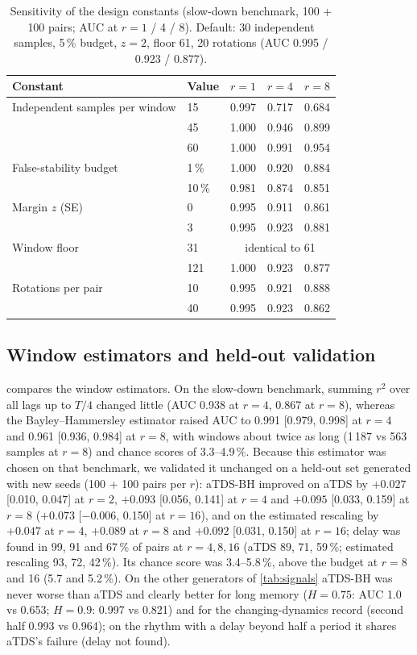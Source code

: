 \documentclass[11pt,a4paper]{article}
\begin{document}
\begin{table}[t]
\centering
\caption{Sensitivity of the design constants (slow-down benchmark, 100 + 100 pairs; AUC at $r = 1$ / 4 / 8). Default: 30 independent samples, 5\,\% budget, $z = 2$, floor 61, 20 rotations (AUC 0.995 / 0.923 / 0.877).}
\label{tab:sensitivity}
\footnotesize
\begin{tabular}{llccc}
\toprule
Constant & Value & $r = 1$ & $r = 4$ & $r = 8$ \\
\midrule
Independent samples per window & 15 & 0.997 & 0.717 & 0.684 \\
 & 45 & 1.000 & 0.946 & 0.899 \\
 & 60 & 1.000 & 0.991 & 0.954 \\
False-stability budget & 1\,\% & 1.000 & 0.920 & 0.884 \\
 & 10\,\% & 0.981 & 0.874 & 0.851 \\
Margin $z$ (SE) & 0 & 0.995 & 0.911 & 0.861 \\
 & 3 & 0.995 & 0.923 & 0.881 \\
Window floor & 31 & \multicolumn{3}{c}{identical to 61} \\
 & 121 & 1.000 & 0.923 & 0.877 \\
Rotations per pair & 10 & 0.995 & 0.921 & 0.888 \\
 & 40 & 0.995 & 0.923 & 0.862 \\
\bottomrule
\end{tabular}
\end{table}

\subsection{Window estimators and held-out validation}
\label{sec:res-bh}
 compares the window estimators. On the slow-down benchmark, summing $r^2$ over all lags up to $T/4$ changed little (AUC 0.938 at $r = 4$, 0.867 at $r = 8$), whereas the Bayley--Hammersley estimator raised AUC to 0.991 [0.979, 0.998] at $r = 4$ and 0.961 [0.936, 0.984] at $r = 8$, with windows about twice as long (1\,187 vs 563 samples at $r = 8$) and chance scores of 3.3--4.9\,\%. Because this estimator was chosen on that benchmark, we validated it unchanged on a held-out set generated with new seeds (100 + 100 pairs per $r$): aTDS-BH improved on aTDS by $+0.027$ [0.010, 0.047] at $r = 2$, $+0.093$ [0.056, 0.141] at $r = 4$ and $+0.095$ [0.033, 0.159] at $r = 8$ ($+0.073$ [$-0.006$, 0.150] at $r = 16$), and on the estimated rescaling by $+0.047$ at $r = 4$, $+0.089$ at $r = 8$ and $+0.092$ [0.031, 0.150] at $r = 16$; delay was found in 99, 91 and 67\,\% of pairs at $r = 4, 8, 16$ (aTDS 89, 71, 59\,\%; estimated rescaling 93, 72, 42\,\%). Its chance score was 3.4--5.8\,\%, above the budget at $r = 8$ and 16 (5.7 and 5.2\,\%). On the other generators of \cref{tab:signals} aTDS-BH was never worse than aTDS and clearly better for long memory ($H = 0.75$: AUC 1.0 vs 0.653; $H = 0.9$: 0.997 vs 0.821) and for the changing-dynamics record (second half 0.993 vs 0.964); on the rhythm with a delay beyond half a period it shares aTDS's failure (delay not found).
\end{document}
